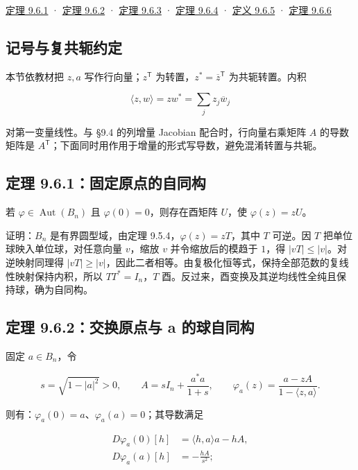 \documentclass[11pt,a4paper]{article}
\begin{document}
\hyperref[ch09-s6-heading-3]{定理 9.6.1} · \hyperref[ch09-s6-heading-4]{定理 9.6.2} ·
\hyperref[ch09-s6-heading-5]{定理 9.6.3} · \hyperref[ch09-s6-heading-6]{定理 9.6.4} ·
\hyperref[ch09-s6-heading-7]{定义 9.6.5} · \hyperref[ch09-s6-heading-8]{定理 9.6.6}

\subsection*{记号与复共轭约定}\label{ch09-s6-heading-2}

本节依教材把 \(z,a\) 写作行向量；\(z^{\mathsf T}\)
为转置，\(z^*=\overline z^{\mathsf T}\) 为共轭转置。内积

\[
\langle z,w\rangle=zw^*=\sum_j z_j\overline w_j
\]

对第一变量线性。与 §9.4 的列增量 Jacobian 配合时，行向量右乘矩阵 \(A\)
的导数矩阵是
\(A^{\mathsf T}\)；下面同时用作用于增量的形式写导数，避免混淆转置与共轭。

\subsection{定理 9.6.1：固定原点的自同构}\label{ch09-s6-heading-3}

若 \(\varphi\in\operatorname{Aut}(B_n)\) 且
\(\varphi(0)=0\)，则存在酉矩阵 \(U\)，使 \(\varphi(z)=zU\)。

证明：\(B_n\) 是有界圆型域，由定理 9.5.4，\(\varphi(z)=zT\)，其中 \(T\)
可逆。因 \(T\) 把单位球映入单位球，对任意向量 \(v\)，缩放 \(v\)
并令缩放后的模趋于 \(1\)，得 \(|vT|\le|v|\)。对逆映射同理得
\(|vT|\ge|v|\)，因此二者相等。由复极化恒等式，保持全部范数的复线性映射保持内积，所以
\(TT^*=I_n\)，\(T\)
酉。反过来，酉变换及其逆均线性全纯且保持球，确为自同构。

\subsection{定理 9.6.2：交换原点与 a 的球自同构}\label{ch09-s6-heading-4}

固定 \(a\in B_n\)，令

\[
s=\sqrt{1-|a|^2}>0,\qquad
A=sI_n+\frac{a^*a}{1+s},\qquad
\varphi_a(z)=\frac{a-zA}{1-\langle z,a\rangle}.
\]

则有：\(\varphi_a(0)=a\)、\(\varphi_a(a)=0\)；其导数满足

\[
\begin{aligned}
D\varphi_a(0)[h]&=\langle h,a\rangle a-hA,\\
D\varphi_a(a)[h]&=-\frac{hA}{s^2};
\end{aligned}
\]
\end{document}
